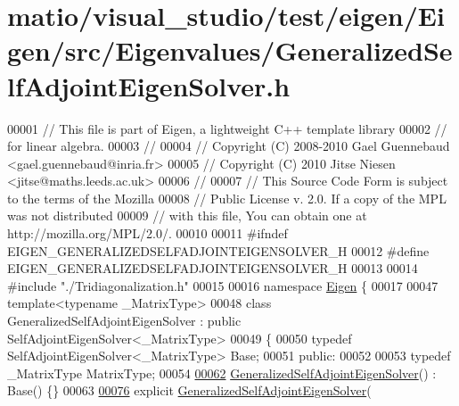 \hypertarget{matio_2visual__studio_2test_2eigen_2_eigen_2src_2_eigenvalues_2_generalized_self_adjoint_eigen_solver_8h_source}{}\section{matio/visual\+\_\+studio/test/eigen/\+Eigen/src/\+Eigenvalues/\+Generalized\+Self\+Adjoint\+Eigen\+Solver.h}
\label{matio_2visual__studio_2test_2eigen_2_eigen_2src_2_eigenvalues_2_generalized_self_adjoint_eigen_solver_8h_source}

\begin{DoxyCode}
00001 \textcolor{comment}{// This file is part of Eigen, a lightweight C++ template library}
00002 \textcolor{comment}{// for linear algebra.}
00003 \textcolor{comment}{//}
00004 \textcolor{comment}{// Copyright (C) 2008-2010 Gael Guennebaud <gael.guennebaud@inria.fr>}
00005 \textcolor{comment}{// Copyright (C) 2010 Jitse Niesen <jitse@maths.leeds.ac.uk>}
00006 \textcolor{comment}{//}
00007 \textcolor{comment}{// This Source Code Form is subject to the terms of the Mozilla}
00008 \textcolor{comment}{// Public License v. 2.0. If a copy of the MPL was not distributed}
00009 \textcolor{comment}{// with this file, You can obtain one at http://mozilla.org/MPL/2.0/.}
00010 
00011 \textcolor{preprocessor}{#ifndef EIGEN\_GENERALIZEDSELFADJOINTEIGENSOLVER\_H}
00012 \textcolor{preprocessor}{#define EIGEN\_GENERALIZEDSELFADJOINTEIGENSOLVER\_H}
00013 
00014 \textcolor{preprocessor}{#include "./Tridiagonalization.h"}
00015 
00016 \textcolor{keyword}{namespace }\hyperlink{namespace_eigen}{Eigen} \{ 
00017 
00047 \textcolor{keyword}{template}<\textcolor{keyword}{typename} \_MatrixType>
00048 \textcolor{keyword}{class }GeneralizedSelfAdjointEigenSolver : \textcolor{keyword}{public} SelfAdjointEigenSolver<\_MatrixType>
00049 \{
00050     \textcolor{keyword}{typedef} SelfAdjointEigenSolver<\_MatrixType> Base;
00051   \textcolor{keyword}{public}:
00052 
00053     \textcolor{keyword}{typedef} \_MatrixType MatrixType;
00054 
\hyperlink{group___eigenvalues___module_a501effdbf722c0609ea05ff3fd4cc721}{00062}     \hyperlink{group___eigenvalues___module_a501effdbf722c0609ea05ff3fd4cc721}{GeneralizedSelfAdjointEigenSolver}() : Base() \{\}
00063 
\hyperlink{group___eigenvalues___module_aac849f01a8c6148c645acd10bd3a9b0e}{00076}     \textcolor{keyword}{explicit} \hyperlink{group___eigenvalues___module_aac849f01a8c6148c645acd10bd3a9b0e}{GeneralizedSelfAdjointEigenSolver}(

\end{DoxyCode}
